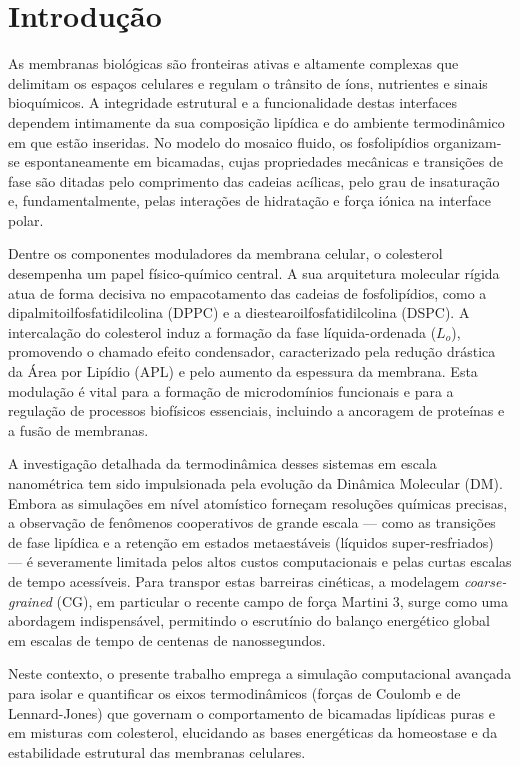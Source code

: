 \section{Introdução}

As membranas biológicas são fronteiras ativas e altamente complexas que delimitam os espaços celulares e regulam o trânsito de íons, nutrientes e sinais bioquímicos. A integridade estrutural e a funcionalidade destas interfaces dependem intimamente da sua composição lipídica e do ambiente termodinâmico em que estão inseridas. No modelo do mosaico fluido, os fosfolipídios organizam-se espontaneamente em bicamadas, cujas propriedades mecânicas e transições de fase são ditadas pelo comprimento das cadeias acílicas, pelo grau de insaturação e, fundamentalmente, pelas interações de hidratação e força iónica na interface polar.

Dentre os componentes moduladores da membrana celular, o colesterol desempenha um papel físico-químico central. A sua arquitetura molecular rígida atua de forma decisiva no empacotamento das cadeias de fosfolipídios, como a dipalmitoilfosfatidilcolina (DPPC) e a diestearoilfosfatidilcolina (DSPC). A intercalação do colesterol induz a formação da fase líquida-ordenada ($L_o$), promovendo o chamado efeito condensador, caracterizado pela redução drástica da Área por Lipídio (APL) e pelo aumento da espessura da membrana. Esta modulação é vital para a formação de microdomínios funcionais e para a regulação de processos biofísicos essenciais, incluindo a ancoragem de proteínas e a fusão de membranas.

A investigação detalhada da termodinâmica desses sistemas em escala nanométrica tem sido impulsionada pela evolução da Dinâmica Molecular (DM). Embora as simulações em nível atomístico forneçam resoluções químicas precisas, a observação de fenômenos cooperativos de grande escala — como as transições de fase lipídica e a retenção em estados metaestáveis (líquidos super-resfriados) — é severamente limitada pelos altos custos computacionais e pelas curtas escalas de tempo acessíveis. Para transpor estas barreiras cinéticas, a modelagem \textit{coarse-grained} (CG), em particular o recente campo de força Martini 3, surge como uma abordagem indispensável, permitindo o escrutínio do balanço energético global em escalas de tempo de centenas de nanossegundos.

Neste contexto, o presente trabalho emprega a simulação computacional avançada para isolar e quantificar os eixos termodinâmicos (forças de Coulomb e de Lennard-Jones) que governam o comportamento de bicamadas lipídicas puras e em misturas com colesterol, elucidando as bases energéticas da homeostase e da estabilidade estrutural das membranas celulares.

